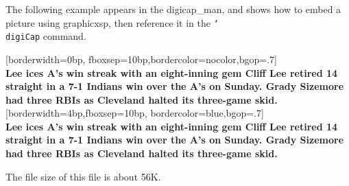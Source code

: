 \documentclass{article}
\newcommand{\cs}[1]{\texttt{\char`\\#1}}
\begin{document}
\maketitle

The following example appears in the \textsf{digicap\_man}, and shows how to embed a
picture using \textsf{graphicxsp}, then reference it in the \cs{digiCap} command.

\begin{center}
[borderwidth=0bp,
    fboxsep=10bp,bordercolor=nocolor,bgop=.7]{\parskip6pt\bfseries
    \makebox[\linewidth]{\textcolor{red}{Lee ices A's win
    streak with an eight-inning gem}}\\\relax\footnotesize
    Lee ices A's win streak with an eight-inning gem Cliff Lee retired
    14 straight in a 7-1 Indians win over the A's on Sunday. Grady
    Sizemore had three RBIs as Cleveland halted its three-game skid.}\\[1ex]
%
[borderwidth=4bp,fboxsep=10bp,
    bordercolor=blue,bgop=.7]{\parskip6pt\bfseries
    \makebox[\linewidth]{\textcolor{webblue}{Lee ices A's win
    streak with an eight-inning gem}}\\\relax\footnotesize
    Lee ices A's win streak with an eight-inning gem Cliff Lee retired
    14 straight in a 7-1 Indians win over the A's on Sunday. Grady
    Sizemore had three RBIs as Cleveland halted its three-game skid.}%
\end{center}
The file size of this file is about 56K.
\end{document}
